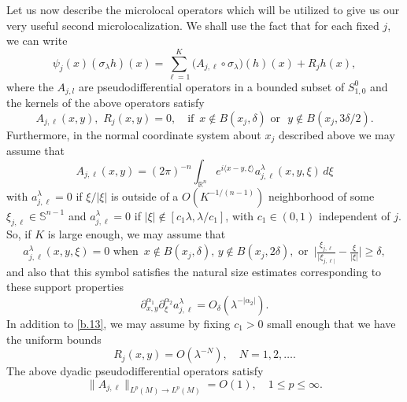 \documentclass[10pt]{amsart}
\newcommand{\Rn}{{\mathbb R}^n}
\newcommand{\la}{\lambda}
\newcommand{\1}{{\bf 1}}
\begin{document}
Let us now describe the microlocal operators which will  be utilized to give us our
very useful second microlocalization.
 We shall use the fact that for each fixed $j$, we can write
\begin{equation}\label{b.12}
\psi_j(x) (\sigma_\la h)(x)=\sum_{\ell=1}^K \bigl(A_{j,\ell} \circ\sigma_\la\bigr)(h)(x)+R_jh(x),
\end{equation}
where the  $A_{j,l}$ are pseudodifferential operators in a bounded subset of $S^0_{1,0}$
and the kernels of the above operators satisfy
\begin{equation}\label{b.13}
A_{j,\ell}(x,y), \, \, R_j(x,y)=0, \quad \text{if } \, x\notin B(x_j,\delta) \, \,
\text{or } \, \, y\notin B(x_j,3\delta/2).
\end{equation}
Furthermore, in the normal coordinate system about $x_j$ described above 
we may assume that
\begin{equation}\label{b.14}
A_{j,\ell}(x,y)=(2\pi)^{-n} \int_{\Rn}e^{i\langle x-y,\xi\rangle} a^\la_{j,\ell}(x,y,\xi) \, d\xi
\end{equation}
 with $a^\la_{j,\ell}=0$ 
if $\xi/|\xi|$ is outside of a $O(K^{-1/(n-1)})$ neighborhood of some
$\xi_{j,\ell}\in \mathbb{S}^{n-1}$ and
$a^\la_{j,\ell}=0$ if $|\xi|\notin [c_1\la, \la/c_1]$, with
$c_1\in (0,1)$ independent of $j$.
  So, if $K$ is large enough, we may assume that
\begin{equation}\label{aas}
a^\la_{j,\ell}(x,y,\xi)=0 \, \, 
\text{when } \, x\notin B(x_j,\delta), \,
y \notin B(x_j,2\delta), \, \, \text{or } \, 
\bigl|\tfrac{\xi_{j,\ell}}{|\xi_{j,\ell|}}-\tfrac{\xi}{|\xi|}\bigr|\ge \delta,
\end{equation}
 and also that this symbol satisfies the natural size estimates corresponding to
 these support properties
$$\partial^{\alpha_1}_{x,y}\partial^{\alpha_2}_\xi a^\la_{j,\ell} =O_\delta(\la^{-|\alpha_2|}).$$
In addition to \eqref{b.13}, we may assume by fixing $c_1>0$ small enough that we have the uniform
bounds
\begin{equation}\label{b.15}
R_j(x,y)=O(\la^{-N}), \quad N=1,2,\dots .
\end{equation}
The above dyadic pseudodifferential operators satisfy
\begin{equation}\label{b.16}
\| A_{j,\ell}\|_{L^p(M)\to L^p(M)}=O(1), \quad 1\le p\le \infty.
\end{equation}
\end{document}
